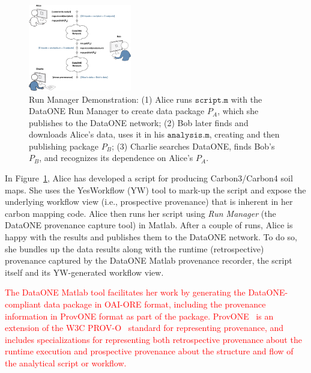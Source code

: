 \documentclass[a4paper]{llncs}
\newcommand{\mytt}[1]{\ensuremath{\mathtt{#1}}}
\begin{document}

\begin{figure}[t] \centering \includegraphics[width=0.4\textwidth]{figs/alice-bob-charlie-sequence-crop} \caption{Run Manager Demonstration: (1) Alice runs \mytt{script.m} with the DataONE Run Manager to create data package $P_A$, which she publishes to the DataONE network; (2) Bob later finds and downloads Alice's data, uses it in his \mytt{analysis.m}, creating and then publishing package $P_B$; (3) Charlie searches DataONE, finds Bob's $P_B$, and recognizes its dependence on Alice's $P_A$.}  \label{fig0} \end{figure}

In Figure~\ref{fig0}, Alice has developed a script for producing Carbon3/Carbon4 soil maps.  She uses the YesWorkflow (YW) tool to mark-up the script and expose the underlying workflow view (i.e., prospective provenance) that is inherent in her carbon mapping code. Alice then runs her script using \emph{Run Manager} (the DataONE provenance capture tool) in Matlab. After a couple of runs, Alice is happy with the results and publishes them to the DataONE network. To do so, she bundles up the data results along with the runtime (retrospective) provenance captured by the DataONE Matlab provenance recorder, the script itself and its YW-generated workflow view.

\textcolor{red}{The DataONE Matlab tool facilitates her work by generating the DataONE-compliant data package in OAI-ORE format, including the provenance information in ProvONE format as part of the package. ProvONE~\cite{provone} is an extension of the W3C PROV-O~\cite{prov-o} standard for representing provenance, and includes specializations for representing both retrospective provenance about the runtime execution and prospective provenance about the structure and flow of the analytical script or workflow.}
\end{document}
